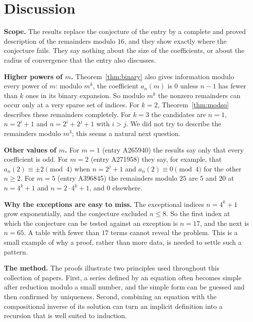 \documentclass[11pt,a4paper]{article}
\theoremstyle{definition}
\theoremstyle{remark}
\newcommand{\para}[1]{\par\medskip\noindent\textbf{#1}\enspace}
\begin{document}
\section{Discussion}\label{sec:discussion}

\para{Scope.} The results replace the conjecture of the entry by a complete and proved description of the remainders
modulo $16$, and they show exactly where the conjecture fails. They say nothing about the size of the coefficients, or
about the radius of convergence that the entry also discusses.

\para{Higher powers of $m$.} Theorem~\ref{thm:binary} also gives information modulo every power of $m$: modulo
$m^k$, the coefficient $a_n(m)$ is $0$ unless $n-1$ has fewer than $k$ ones in its binary expansion. So modulo $m^k$
the nonzero remainders can occur only at a very sparse set of indices. For $k=2$, Theorem~\ref{thm:modsq} describes these
remainders completely. For $k=3$ the candidates are $n=1$, $n=2^i+1$ and $n=2^i+2^j+1$ with $i>j$. We did not try to
describe the remainders modulo $m^3$; this seems a natural next question.

\para{Other values of $m$.} For $m=1$ (entry A265940) the results say only that every coefficient is odd. For $m=2$
(entry A271958) they say, for example, that $a_n(2)\equiv\pm2\pmod 4$ when $n=2^j+1$ and $a_n(2)\equiv0\pmod4$ for the
other $n\ge2$. For $m=5$ (entry A396845) the remainders modulo $25$ are $5$ and $20$ at $n=4^k+1$ and $n=2\cdot4^k+1$,
and $0$ elsewhere.

\para{Why the exceptions are easy to miss.} The exceptional indices $n=4^k+1$ grow exponentially, and the conjecture
excluded $n\le8$. So the first index at which the conjecture can be tested against an exception is $n=17$, and the next is
$n=65$. A table with fewer than $17$ terms cannot reveal the problem. This is a small example of why a proof, rather than
more data, is needed to settle such a pattern.

\para{The method.} The proofs illustrate two principles used throughout this collection of papers. First, a series
defined by an equation often becomes simple after reduction modulo a small number, and the simple form can be guessed
and then confirmed by uniqueness. Second, combining an equation with the compositional inverse of its solution can
turn an implicit definition into a recursion that is well suited to induction.
\end{document}
